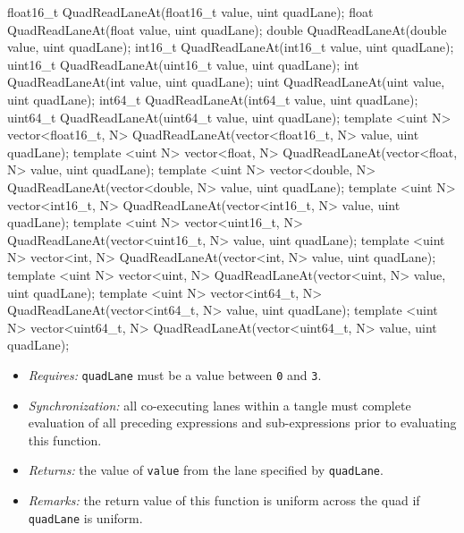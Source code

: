 \begin{HLSL}
float16_t QuadReadLaneAt(float16_t value, uint quadLane);
float QuadReadLaneAt(float value, uint quadLane);
double QuadReadLaneAt(double value, uint quadLane);
int16_t QuadReadLaneAt(int16_t value, uint quadLane);
uint16_t QuadReadLaneAt(uint16_t value, uint quadLane);
int QuadReadLaneAt(int value, uint quadLane);
uint QuadReadLaneAt(uint value, uint quadLane);
int64_t QuadReadLaneAt(int64_t value, uint quadLane);
uint64_t QuadReadLaneAt(uint64_t value, uint quadLane);
template <uint N>
vector<float16_t, N> QuadReadLaneAt(vector<float16_t, N> value, uint quadLane);
template <uint N>
vector<float, N> QuadReadLaneAt(vector<float, N> value, uint quadLane);
template <uint N>
vector<double, N> QuadReadLaneAt(vector<double, N> value, uint quadLane);
template <uint N>
vector<int16_t, N> QuadReadLaneAt(vector<int16_t, N> value, uint quadLane);
template <uint N>
vector<uint16_t, N> QuadReadLaneAt(vector<uint16_t, N> value, uint quadLane);
template <uint N>
vector<int, N> QuadReadLaneAt(vector<int, N> value, uint quadLane);
template <uint N>
vector<uint, N> QuadReadLaneAt(vector<uint, N> value, uint quadLane);
template <uint N>
vector<int64_t, N> QuadReadLaneAt(vector<int64_t, N> value, uint quadLane);
template <uint N>
vector<uint64_t, N> QuadReadLaneAt(vector<uint64_t, N> value, uint quadLane);
\end{HLSL}

\begin{itemize}
  \item \textit{Requires:} \texttt{quadLane} must be a value between \texttt{0}
  and \texttt{3}.
  \item \textit{Synchronization:} all co-executing \gls{lane}s within a \gls{tangle}
  must complete evaluation of all preceding expressions and sub-expressions
  prior to evaluating this function.
  \item \textit{Returns:} the value of \texttt{value} from the \gls{lane}
  specified by \texttt{quadLane}.
  \item \textit{Remarks:} the return value of this function is uniform across
  the \gls{quad} if \texttt{quadLane} is uniform.
\end{itemize}

